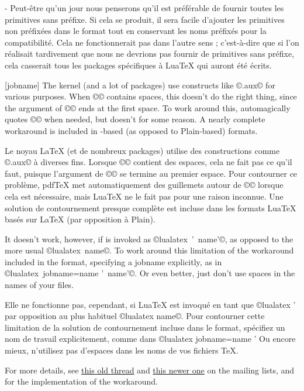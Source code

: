 \documentclass{lltxdoc}
\begin{document}
- Peut-être qu'un jour nous penserons qu'il est préférable de fournir toutes les primitives sans préfixe. Si cela se produit, il sera facile d'ajouter les primitives non préfixées dans le format tout en conservant les noms préfixés pour la compatibilité. Cela ne fonctionnerait pas dans l'autre sens ; c'est-à-dire que si l'on réalisait tardivement que nous ne devrions pas fournir de primitives sans préfixe, cela casserait tous les packages spécifiques à LuaTeX qui auront été écrits.

[jobname]
The \latex kernel (and a lot of packages) use constructs like
©\jobname.aux© for various purposes. When ©\jobname© contains spaces,
this doesn't do the right thing, since the argument of ©© ends at the
first space. To work around this, \pdftex automagically quotes ©\jobname© when
needed, but \luatex doesn't for some reason. A nearly complete workaround is
included in \latex-based (as opposed to Plain-based) \luatex formats.

Le noyau LaTeX (et de nombreux packages) utilise des constructions comme ©\jobname.aux© à diverses fins. Lorsque ©\jobname© contient des espaces, cela ne fait pas ce qu'il faut, puisque l'argument de ©© se termine au premier espace. Pour contourner ce problème, pdfTeX met automatiquement des guillemets autour de ©\jobname© lorsque cela est nécessaire, mais LuaTeX ne le fait pas pour une raison inconnue. Une solution de contournement presque complète est incluse dans les formats LuaTeX basés sur LaTeX (par opposition à Plain).

It doesn't work, however, if \luatex is invoked as ©lualatex ' name'©,
as opposed to the more usual ©lualatex name©. To work around this
limitation of the workaround included in the format, specifying a jobname
explicitly, as in ©lualatex jobname=name ' name'©. Or even better, just
don't use spaces in the names of your \tex files.


Elle ne fonctionne pas, cependant, si LuaTeX est invoqué en tant que ©lualatex ' par opposition au plus habituel ©lualatex name©. Pour contourner cette limitation de la solution de contournement incluse dans le format, spécifiez un nom de travail explicitement, comme dans ©lualatex jobname=name ' Ou encore mieux, n'utilisez pas d'espaces dans les noms de vos fichiers TeX.

For more details, see
\href{http://www.ntg.nl/pipermail/dev-luatex/2009-April/002549.html}{this old
  thread} and
\href{http://tug.org/pipermail/luatex/2010-August/001986.html}{this newer one}
on the \luatex mailing lists, and  for the
implementation of the workaround.
\end{document}
